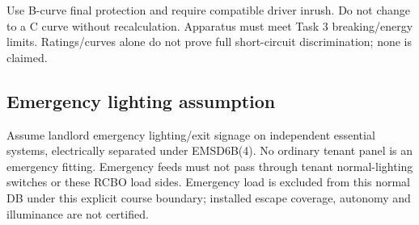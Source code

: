 Use B-curve final protection and require compatible driver inrush. Do not change to a C curve without recalculation. Apparatus must meet Task 3 breaking/energy limits. Ratings/curves alone do not prove full short-circuit discrimination;  none is claimed.
\subsection*{Emergency lighting assumption}
Assume landlord emergency lighting/exit signage on independent essential systems, electrically separated under EMSD6B(4). No ordinary tenant panel is an emergency fitting. Emergency feeds must not pass through tenant normal-lighting switches or these RCBO load sides. Emergency load is excluded from this normal DB under this explicit course boundary;  installed escape coverage, autonomy and illuminance are not certified.
